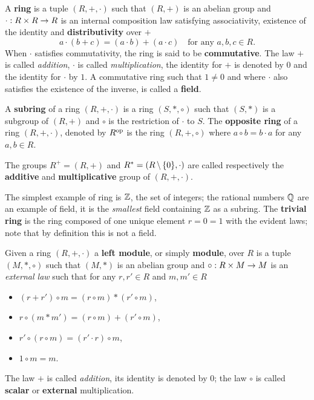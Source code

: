 
A \textbf{ring} is a tuple $(R,+,\cdot)$ such that $(R,+)$
is an abelian group and $\cdot:R\times R\rightarrow R$ is an internal
composition law satisfying associativity, existence of the identity
and \textbf{distributivity} over $+$
\[a \cdot (b + c) = (a\cdot b) + (a\cdot c) \quad\text{for any
  $a,b,c\in R$.}\] When $\cdot$ satisfies commutativity, the ring is
said to be \textbf{commutative}.  The law $+$
is called \emph{addition}, $\cdot$ is called \emph{multiplication},
the identity for $+$ is denoted by $0$ and the identity for $\cdot$ by
$1$.  A commutative ring such that $1\ne 0$ and where $\cdot$ also
satisfies the existence of the inverse, is called a
\textbf{field}.

A \textbf{subring} of a ring $(R,+,\cdot)$ is a ring
$(S,\ast,\circ)$ such that $(S,\ast)$ is a subgroup of $(R,+)$ and
$\circ$ is the restriction of $\cdot$ to $S$.  The
\textbf{opposite ring}
of a ring $(R,+,\cdot)$, denoted by $R^{\mathrm{op}}$ is the ring $(R,+,\circ)$
where $a\circ b=b\cdot a$ for any $a,b\in R$.

The groups $R^+=(R,+)$ and $R^\ast=(R\,\backslash\,\{0\},\cdot)$ are called
respectively the \textbf{additive} and
\textbf{multiplicative} group of
$(R,+,\cdot)$.

The simplest example of ring is $\mathbb{Z}$, the set of integers; the
rational numbers $\mathbb{Q}$ are an example of field, it is the
\emph{smallest} field containing $\mathbb{Z}$ as a subring. The
\textbf{trivial ring} is the ring composed of one
unique element $r=0=1$ with the evident laws; note that by definition
this is not a field.

Given a ring $(R,+,\cdot)$ a \textbf{left
  module}, or simply \textbf{module}, over $R$ is a tuple $(M, \ast,
\circ)$ such that $(M,\ast)$ is an abelian group and $\circ:R\times
M\rightarrow M$ is an \emph{external law} such that for any $r,r'\in R$ and
$m,m'\in R$
\begin{itemize}
\item $(r + r')\circ m = (r \circ m) \ast (r'\circ m)$,
\item $r\circ(m\ast m') = (r\circ m) + (r'\circ m)$,
\item $r'\circ(r\circ m ) = (r'\cdot r)\circ m$,
\item $1\circ m = m$.
\end{itemize}
The law $+$ is called \emph{addition}, its identity is denoted by $0$;
the law $\circ$ is called
\textbf{scalar}
or
\textbf{external}
multiplication.

